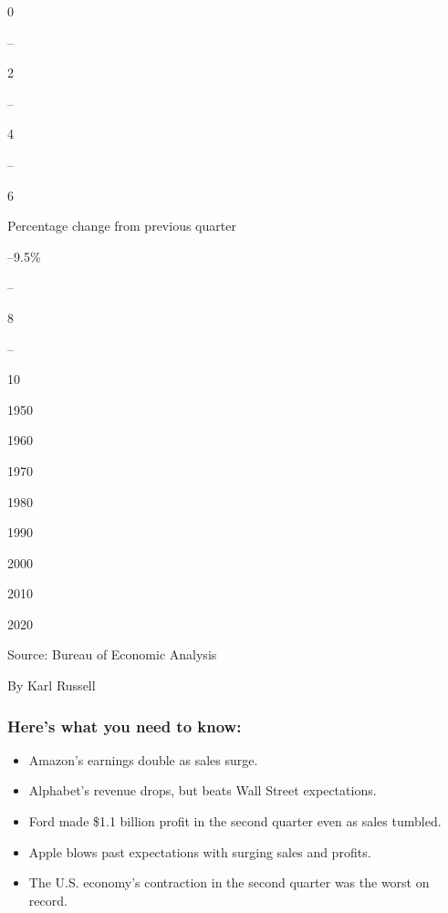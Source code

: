 0

--

2

--

4

--

6

Percentage change from previous quarter

--9.5\%

--

8

--

10

1950

1960

1970

1980

1990

2000

2010

2020

Source: Bureau of Economic Analysis

By Karl Russell

\hypertarget{heres-what-you-need-to-know}{%
\subsubsection{Here's what you need to
know:}\label{heres-what-you-need-to-know}}

\begin{itemize}
\item
  \protect\hyperlink{amazons-earnings-double-as-sales-surge}{}

  Amazon's earnings double as sales surge.
\item
  \protect\hyperlink{alphabets-revenue-drops-but-beats-wall-street-expectations}{}

  Alphabet's revenue drops, but beats Wall Street expectations.
\item
  \protect\hyperlink{ford-made-1-1-billion-profit-in-the-second-quarter-even-as-sales-tumbled}{}

  Ford made \$1.1 billion profit in the second quarter even as sales
  tumbled.
\item
  \protect\hyperlink{apple-blows-past-expectations-with-surging-sales-and-profits}{}

  Apple blows past expectations with surging sales and profits.
\item
  \protect\hyperlink{the-us-economys-contraction-in-the-second-quarter-was-the-worst-on-record}{}

  The U.S. economy's contraction in the second quarter was the worst on
  record.
\end{itemize}

